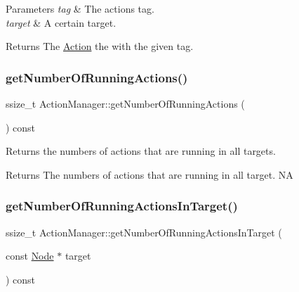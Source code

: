 \begin{DoxyParams}{Parameters}
{\em tag} & The action\textquotesingle{}s tag. \\
\hline
{\em target} & A certain target. \\
\hline
\end{DoxyParams}
\begin{DoxyReturn}{Returns}
The \hyperlink{classAction}{Action} the with the given tag. 
\end{DoxyReturn}
\mbox{\label{classActionManager_a3c4f7527f61b3429bbdf92e1d56bb867}} 
\subsubsection{\texorpdfstring{get\+Number\+Of\+Running\+Actions()}{getNumberOfRunningActions()}}
{\footnotesize\ttfamily ssize\+\_\+t Action\+Manager\+::get\+Number\+Of\+Running\+Actions (\begin{DoxyParamCaption}{ }\end{DoxyParamCaption}) const\hspace{0.3cm}{\ttfamily [virtual]}}

Returns the numbers of actions that are running in all targets. \begin{DoxyReturn}{Returns}
The numbers of actions that are running in all target.  NA 
\end{DoxyReturn}
\mbox{\label{classActionManager_add35fb2d5810bec63b59f432830746bc}} 
\subsubsection{\texorpdfstring{get\+Number\+Of\+Running\+Actions\+In\+Target()}{getNumberOfRunningActionsInTarget()}\hspace{0.1cm}{\footnotesize\ttfamily [1/2]}}
{\footnotesize\ttfamily ssize\+\_\+t Action\+Manager\+::get\+Number\+Of\+Running\+Actions\+In\+Target (\begin{DoxyParamCaption}\item[{const \hyperlink{classNode}{Node} $\ast$}]{target }\end{DoxyParamCaption}) const}

